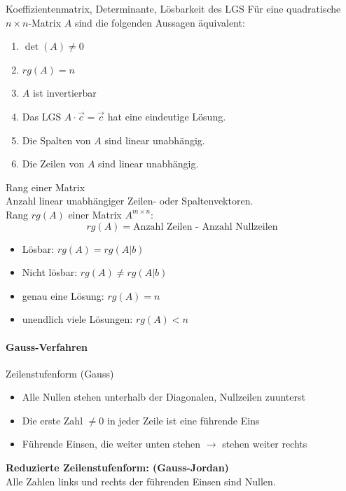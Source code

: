     \begin{theorem}{Koeffizientenmatrix{,} Determinante{,} Lösbarkeit des LGS }
        Für eine quadratische $n\times n$-Matrix $A$ sind die folgenden Aussagen äquivalent:
        \begin{enumerate}
            \item $\det(A)\neq 0$
            \item $rg(A)=n$
            \item $A$ ist invertierbar
            \item Das LGS $A\cdot\vec{c}=\vec{c}$ hat eine eindeutige Lösung.
            \item Die Spalten von $A$ sind linear unabhängig.
            \item Die Zeilen von $A$ sind linear unabhängig.
        \end{enumerate}
    \end{theorem}

\begin{theorem}{Rang einer Matrix}\\
    Anzahl linear unabhängiger Zeilen- oder Spaltenvektoren.\\
    Rang $rg(A)$ einer Matrix $A^{m \times n}$:
    $$rg(A) = \text{Anzahl Zeilen - Anzahl Nullzeilen}$$
    \begin{itemize}
        \item Lösbar: $rg(A) = rg(A|b)$
        \item Nicht lösbar: $rg(A) \neq rg(A|b)$
        \item genau eine Lösung: $rg(A) = n$
        \item unendlich viele Lösungen: $rg(A) < n$
    \end{itemize}
\end{theorem}

\paragraph{Gauss-Verfahren}

\begin{concept}{Zeilenstufenform (Gauss)}
    \begin{itemize}
        \item Alle Nullen stehen unterhalb der Diagonalen, Nullzeilen zuunterst
        \item Die erste Zahl $\neq 0$ in jeder Zeile ist eine führende Eins
        \item Führende Einsen, die weiter unten stehen $\rightarrow$ stehen weiter rechts
    \end{itemize}
    \textbf{Reduzierte Zeilenstufenform: (Gauss-Jordan)}\\
    Alle Zahlen links und rechts der führenden Einsen sind Nullen.
\end{concept}



